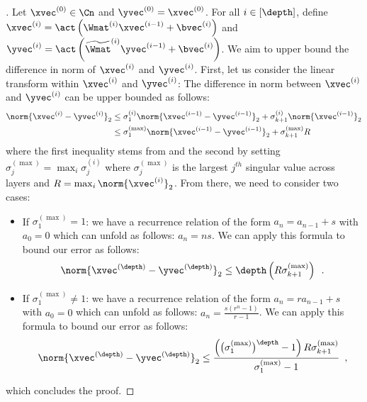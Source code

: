 \begin{proof}[]
  Let $\xvec^{(0)} \in \Cn$ and $\yvec^{(0)} = \xvec^{(0)}$.
  For all $i \in [\depth]$, define $\xvec^{(i)} = \act \left(\Wmat^{(i)} \xvec^{(i-1)} + \bvec^{(i)} \right)$ and $\yvec^{(i)} = \act \left( \widetilde{\Wmat}^{(i)} \yvec^{(i-1)} + \bvec^{(i)} \right)$.
  We aim to upper bound the difference in norm of $\xvec^{(i)}$ and $\yvec^{(i)}$.
  First, let us consider the linear transform within $\xvec^{(i)}$ and $\yvec^{(i)}$:
  The difference in norm between $\xvec^{(i)}$ and $\yvec^{(i)}$ can be upper bounded as follows:
  \begin{align}
    \norm{ \xvec^{(i)} - \yvec^{(i)}}_2 &\le \sigma_{1}^{(i)} \norm{ \xvec^{(i-1)} - \yvec^{(i-1)}}_2 + \sigma_{k+1}^{(i)} \norm{ \xvec^{(i-1)}}_2 \\
    &\leq \sigma_1^{(\max)} \norm{ \xvec^{(i-1)} - \yvec^{(i-1)}}_2 + \sigma_{k+1}^{(\max)} R
  \end{align}
  where the first inequality stems from  and the second by setting $\sigma_j^{(\max)} = \max_i \sigma_j^{(i)}$ where $\sigma_j^{(\max)}$ is the largest $j^{th}$ singular value across layers and $R = \max_i \norm{\xvec^{(i)}}_2$.
  From there, we need to consider two cases:
  \begin{itemize}
    \item If $\sigma_1^{(\max)} = 1$: we have a recurrence relation of the form $a_n = a_{n-1} + s$ with $a_0 = 0$ which can unfold as follows: $a_n = ns$.
      We can apply this formula to bound our error as follows:
      \begin{equation}
	\norm{ \xvec^{(\depth)} - \yvec^{(\depth)}}_2 \le \depth \left(  R \sigma_{k+1}^{(\max)} \right) \enspace.
      \end{equation}
    \item If $\sigma_1^{(\max)} \neq 1$: we have a recurrence relation of the form $a_n = r a_{n-1} + s$ with $a_0= 0$ which can unfold as follows: $a_n = \frac{s \left(r^n - 1\right)}{r-1}$.
      We can apply this formula to bound our error as follows:
      \begin{equation}
	\norm{ \xvec^{(\depth)} - \yvec^{(\depth)} }_2 \le \frac{ \left( \big(\sigma_1^{(\max)}\big)^\depth - 1 \right) R \sigma_{k+1}^{(\max)}}{\sigma_1^{(\max)}-1} \enspace,
      \end{equation}
  \end{itemize}
  which concludes the proof.
\end{proof}

